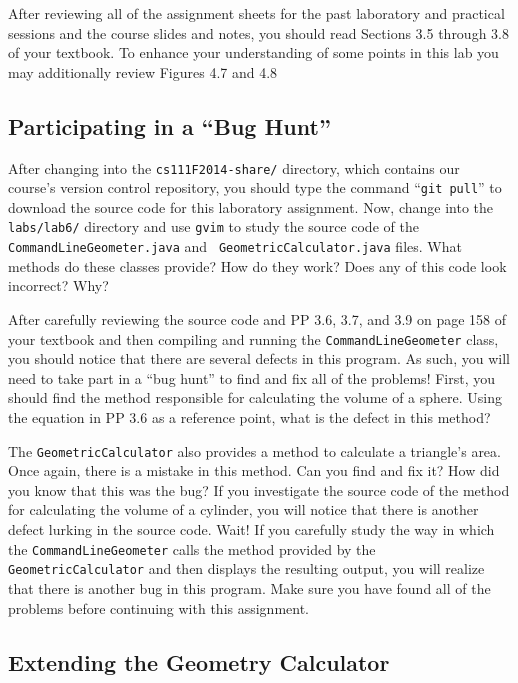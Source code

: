 After reviewing all of the assignment sheets for the past laboratory and practical sessions and the course slides and
notes, you should read Sections 3.5 through 3.8 of your textbook. To enhance your understanding of some points in this
lab you may additionally review Figures 4.7 and 4.8

\vspace*{-.1in}
\subsection*{Participating in a ``Bug Hunt''}

After changing into the {\tt cs111F2014-share/} directory, which contains our course's version control repository, you
should type the command ``{\tt git pull}'' to download the source code for this laboratory assignment. Now, change into
the {\tt labs/lab6/} directory and use {\tt gvim} to study the source code of the {\tt CommandLineGeometer.java} and {\tt
  GeometricCalculator.java} files. What methods do these classes provide? How do they work? Does any of this code look
incorrect? Why?

After carefully reviewing the source code and PP 3.6, 3.7, and 3.9 on page 158 of your textbook and then compiling and
running the {\tt CommandLineGeometer} class, you should notice that there are several defects in this program. As
such, you will need to take part in a ``bug hunt'' to find and fix all of the problems! First, you should find the
method responsible for calculating the volume of a sphere. Using the equation in PP 3.6 as a reference point, what is
the defect in this method?

The {\tt GeometricCalculator} also provides a method to calculate a triangle's area.  Once again, there is a
mistake in this method.  Can you find and fix it? How did you know that this was the bug? If you investigate the source
code of the method for calculating the volume of a cylinder, you will notice that there is another defect lurking in the
source code. Wait! If you carefully study the way in which the {\tt CommandLineGeometer} calls the method
provided by the {\tt GeometricCalculator} and then displays the resulting output, you will realize that there is another
bug in this program. Make sure you have found all of the problems before continuing with this assignment.

\vspace*{-.1in}
\subsection*{Extending the Geometry Calculator}

